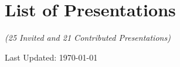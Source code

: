 \documentclass[10pt,a4paper,roman,]{moderncv} %
\begin{document}
% 




\clearpage
\section{List of Presentations}
\begin{center}
    \textit{(25 Invited and 21 Contributed Presentations)\\}
\end{center}

 
{}




\begin{center}
    Last Updated: \today
\end{center}
\end{document}

